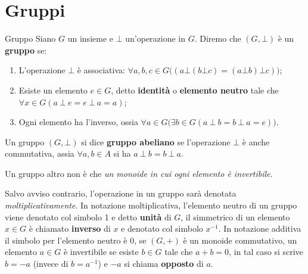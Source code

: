 \section{Gruppi}
\begin{defbox}{Gruppo}
	Siano $G$ un insieme e $\bot$ un'operazione in $G$. Diremo che $(G,\bot)$ è un \textbf{gruppo} se:
	\begin{enumerate}
		\item L'operazione $\bot$ è associativa: $\forall a,b,c \in G \bigl((a \bot (b \bot c) = (a \bot b) \bot c)\bigr)$;
		\item Esiste un elemento $e \in G$, detto \textbf{identità} o \textbf{elemento neutro} tale che $\forall x \in G (a \ \bot \ e = e \ \bot \ a = a)$;
		\item Ogni elemento ha l'inverso, ossia $
		\forall a \in G\bigl(\exists b \in G (a \ \bot \ b = b \ \bot \ a = e)\bigr)$.
	\end{enumerate}
	Un gruppo $(G, \bot)$ si dice \textbf{gruppo abeliano} se l'operazione $\bot$ è anche commutativa, assia $\forall a,b \in A $ si ha $a\  \bot \ b = b \ \bot \ a$.
\end{defbox}


\begin{osservation}
	Un gruppo altro non è che \emph{un monoide in cui ogni elemento è invertibile}.
\end{osservation}


Salvo avviso contrario, l'operazione in un gruppo sarà denotata \textit{moltiplicativamente}. In notazione moltiplicativa, l'elemento neutro di un gruppo viene denotato col simbolo 1 e detto \textbf{unità} di $G$, il simmetrico di un elemento $x \in G$ è chiamato \textbf{inverso} di $x$ e denotato col simbolo $x^{-1}$. In notazione additiva il simbolo per l'elemento neutro è $0$, se $(G,+)$ è un monoide commutativo, un elemento $a \in G$ è invertibile se esiste $b \in G$ tale che $a+b=0$, in tal caso si scrive $b=-a$ (invece di $b=a^{-1}$) e $-a$ si chiama \textbf{opposto} di $a$.

